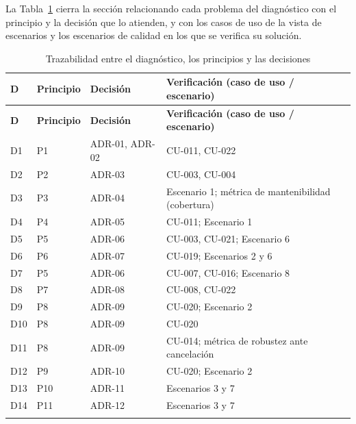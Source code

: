 \documentclass[11pt,a4paper]{article}
\DeclareRobustCommand{\_}{\textunderscore\allowbreak}
\begin{document}
La Tabla~\ref{tab:traza_diagnostico} cierra la sección relacionando cada problema del diagnóstico con el principio y la decisión que lo atienden, y con los casos de uso de la vista de escenarios y los escenarios de calidad en los que se verifica su solución.

\begin{center}
\small
\begin{longtable}{|>{\raggedright\arraybackslash}p{}|>{\raggedright\arraybackslash}p{}|>{\raggedright\arraybackslash}p{}|>{\raggedright\arraybackslash}p{}|}
\hline
\textbf{D} & \textbf{Principio} & \textbf{Decisión} & \textbf{Verificación (caso de uso / escenario)} \\
\hline
\endfirsthead
\hline
\textbf{D} & \textbf{Principio} & \textbf{Decisión} & \textbf{Verificación (caso de uso / escenario)} \\
\hline
\endhead
D1 & P1 & ADR-01, ADR-02 & CU-011, CU-022 \\
\hline
D2 & P2 & ADR-03 & CU-003, CU-004 \\
\hline
D3 & P3 & ADR-04 & Escenario 1; métrica de mantenibilidad (cobertura) \\
\hline
D4 & P4 & ADR-05 & CU-011; Escenario 1 \\
\hline
D5 & P5 & ADR-06 & CU-003, CU-021; Escenario 6 \\
\hline
D6 & P6 & ADR-07 & CU-019; Escenarios 2 y 6 \\
\hline
D7 & P5 & ADR-06 & CU-007, CU-016; Escenario 8 \\
\hline
D8 & P7 & ADR-08 & CU-008, CU-022 \\
\hline
D9 & P8 & ADR-09 & CU-020; Escenario 2 \\
\hline
D10 & P8 & ADR-09 & CU-020 \\
\hline
D11 & P8 & ADR-09 & CU-014; métrica de robustez ante cancelación \\
\hline
D12 & P9 & ADR-10 & CU-020; Escenario 2 \\
\hline
D13 & P10 & ADR-11 & Escenarios 3 y 7 \\
\hline
D14 & P11 & ADR-12 & Escenarios 3 y 7 \\
\hline
\caption{Trazabilidad entre el diagnóstico, los principios y las decisiones} \label{tab:traza_diagnostico} \\
\end{longtable}
\end{center}

\end{document}
